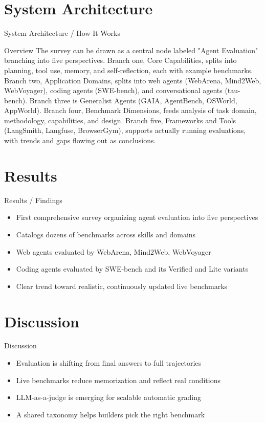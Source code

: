 \documentclass[10pt]{beamer}
\begin{document}
\section{System Architecture}
\begin{frame}{System Architecture / How It Works}
  \begin{block}{Overview}
  The survey can be drawn as a central node labeled "Agent Evaluation" branching into five perspectives. Branch one, Core Capabilities, splits into planning, tool use, memory, and self-reflection, each with example benchmarks. Branch two, Application Domains, splits into web agents (WebArena, Mind2Web, WebVoyager), coding agents (SWE-bench), and conversational agents (tau-bench). Branch three is Generalist Agents (GAIA, AgentBench, OSWorld, AppWorld). Branch four, Benchmark Dimensions, feeds analysis of task domain, methodology, capabilities, and design. Branch five, Frameworks and Tools (LangSmith, Langfuse, BrowserGym), supports actually running evaluations, with trends and gaps flowing out as conclusions.
  \end{block}
\end{frame}

\section{Results}
\begin{frame}[allowframebreaks]{Results / Findings}
\begin{itemize}
  \item First comprehensive survey organizing agent evaluation into five perspectives
  \item Catalogs dozens of benchmarks across skills and domains
  \item Web agents evaluated by WebArena, Mind2Web, WebVoyager
  \item Coding agents evaluated by SWE-bench and its Verified and Lite variants
  \item Clear trend toward realistic, continuously updated live benchmarks
\end{itemize}
\end{frame}

\section{Discussion}
\begin{frame}{Discussion}
\begin{itemize}
  \item Evaluation is shifting from final answers to full trajectories
  \item Live benchmarks reduce memorization and reflect real conditions
  \item LLM-as-a-judge is emerging for scalable automatic grading
  \item A shared taxonomy helps builders pick the right benchmark
\end{itemize}
\end{frame}
\end{document}
